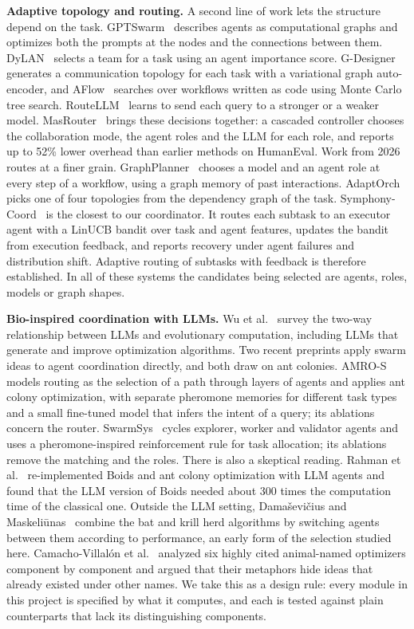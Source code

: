 \documentclass[11pt,a4paper]{article}
\newcommand{\runin}[1]{\textbf{#1}\quad}
\begin{document}
\runin{Adaptive topology and routing.}
A second line of work lets the structure depend on the task. GPTSwarm~\cite{zhuge2024gptswarm} describes
agents as computational graphs and optimizes both the prompts at the nodes and the connections between
them. DyLAN~\cite{liu2024dylan} selects a team for a task using an agent importance score.
G-Designer~\cite{zhang2025gdesigner} generates a communication topology for each task with a variational
graph auto-encoder, and AFlow~\cite{zhang2025aflow} searches over workflows written as code using Monte
Carlo tree search. RouteLLM~\cite{ong2025routellm} learns to send each query to a stronger or a weaker
model. MasRouter~\cite{yue2025masrouter} brings these decisions together: a cascaded controller chooses the
collaboration mode, the agent roles and the LLM for each role, and reports up to 52\% lower overhead than
earlier methods on HumanEval. Work from 2026 routes at a finer grain. GraphPlanner~\cite{feng2026graphplanner}
chooses a model and an agent role at every step of a workflow, using a graph memory of past interactions.
AdaptOrch~\cite{yu2026adaptorch} picks one of four topologies from the dependency graph of the task.
Symphony-Coord~\cite{guan2026symphony} is the closest to our coordinator. It routes each subtask to an
executor agent with a LinUCB bandit over task and agent features, updates the bandit from execution
feedback, and reports recovery under agent failures and distribution shift. Adaptive routing of subtasks
with feedback is therefore established. In all of these systems the candidates being selected are agents,
roles, models or graph shapes.

\runin{Bio-inspired coordination with LLMs.}
Wu et al.~\cite{wu2025ecllm} survey the two-way relationship between LLMs and evolutionary computation,
including LLMs that generate and improve optimization algorithms. Two recent preprints apply swarm ideas to
agent coordination directly, and both draw on ant colonies. AMRO-S~\cite{wang2026amros} models routing as
the selection of a path through layers of agents and applies ant colony optimization, with separate
pheromone memories for different task types and a small fine-tuned model that infers the intent of a
query; its ablations concern the router. SwarmSys~\cite{li2025swarmsys} cycles explorer, worker and
validator agents and uses a pheromone-inspired reinforcement rule for task allocation; its ablations remove
the matching and the roles. There is also a skeptical reading. Rahman et al.~\cite{rahman2026swarms}
re-implemented Boids and ant colony optimization with LLM agents and found that the LLM version of Boids
needed about 300 times the computation time of the classical one. Outside the LLM setting,
Dama\v{s}evi\v{c}ius and Maskeli\={u}nas~\cite{damasevicius2021} combine the bat and krill herd algorithms
by switching agents between them according to performance, an early form of the selection studied here.
Camacho-Villal\'on et al.~\cite{camacho2023} analyzed six highly cited animal-named optimizers component by
component and argued that their metaphors hide ideas that already existed under other names. We take this
as a design rule: every module in this project is specified by what it computes, and each is tested against
plain counterparts that lack its distinguishing components.
\end{document}
